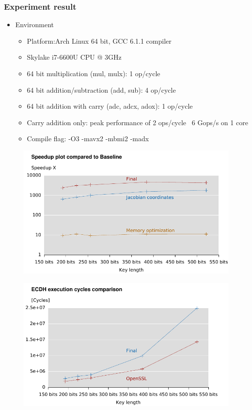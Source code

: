 \begin{frame}
  \frametitle{Experiment result}
  \begin{itemize}
  \item{Environment
  \begin{itemize}
  \setlength\itemsep{0.5em}
  \item{Platform:Arch Linux 64 bit, GCC 6.1.1 compiler}
  \item{Skylake i7-6600U CPU @ 3GHz}
  \item{64 bit multiplication (mul, mulx): 1 op/cycle}
  \item{64 bit addition/subtraction (add, sub): 4 op/cycle}
  \item{64 bit addition with carry (adc, adcx, adox): 1 op/cycle}
  \item{Carry addition only: peak performance of 2 ops/cycle ~6 Gops/s on 1 core}
  \item{Compile flag: -O3 -mavx2 -mbmi2 -madx}
  \end{itemize}
}
  \setlength\itemsep{1.5em}
  \end{itemize}
\end{frame}
\begin{frame}
\begin{figure}\flushleft		
\includegraphics[scale=0.9, trim={0 0 0 0}]{speedup}		
\end{figure}
\end{frame}
\begin{frame}
\begin{figure}\flushleft		
\includegraphics[scale=0.9, trim={0 0 0 0}]{ecdh}		
\end{figure}
\end{frame}
